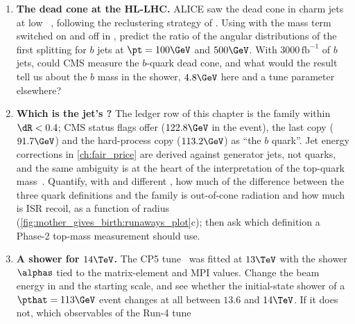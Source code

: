 \begin{enumerate}
    ordering of ISR changes the soft initial-state activity by a third
    (\cref{sec:mother_gives_birth:pythia}). Run the validation script with
    and without  and compare the \pt spectrum and
    rapidity of the hardest initial-state parton, the ``third jet'' of a
    dijet event. This is a region where the logarithmic accuracy of dipole
    showers is known to be deficient~\cite{Dasgupta:2018nvj,vanBeekveld:2022zhl};
    which existing CMS measurement constrains the option, and would a
    $14\TeV$ measurement of the third-jet rate at high rapidity do better?
  \item \textbf{The dead cone at the HL-LHC.} ALICE saw the dead cone in
    charm jets at low \pt~\cite{ALICE:2021aqk}, following the
    reclustering strategy of \cite{Maltoni:2016ays}. Using 
    with the mass term switched on and off in , predict
    the ratio of the angular distributions of the first splitting for $b$
    jets at $\pt=100\GeV$ and $500\GeV$. With $3000\,\mathrm{fb}^{-1}$ of
    $b$ jets, could CMS measure the $b$-quark dead cone, and what would the
    result tell us about the $b$ mass in the shower, $4.8\GeV$ here and a
    tune parameter elsewhere?
  \item \textbf{Which \pt is the jet's \pt?} The ledger row of this chapter
    is the family within $\dR<0.4$; CMS status flags offer
     ($122.8\GeV$ in the \CMSSW event), the last
    copy ($91.7\GeV$) and the hard-process copy ($113.2\GeV$) as ``the $b$
    quark''. Jet energy corrections in \cref{ch:fair_price} are derived
    against generator jets, not quarks, and the same ambiguity is at the
    heart of the interpretation of the top-quark
    mass~\cite{Nason:2017cxd,Hoang:2020iah}. Quantify, with 
    and different , how much of the difference between the
    three quark definitions and the family is out-of-cone radiation and how
    much is ISR recoil, as a function of radius
    (\cref{fig:mother_gives_birth:runaways_plot}c); then ask which
    definition a Phase-2 top-mass measurement should use.
  \item \textbf{A shower for $14\TeV$.} The CP5 tune~\cite{CMS:2019csb}
    was fitted at $13\TeV$ with the shower $\alphas$ tied to the
    matrix-element and MPI values. Change the beam energy in
     and the starting scale, and see whether the
    initial-state shower of a $\pthat=113\GeV$ event changes at all between
    $13.6$ and $14\TeV$. If it does not, which observables of the Run-4 tune

\end{enumerate}
